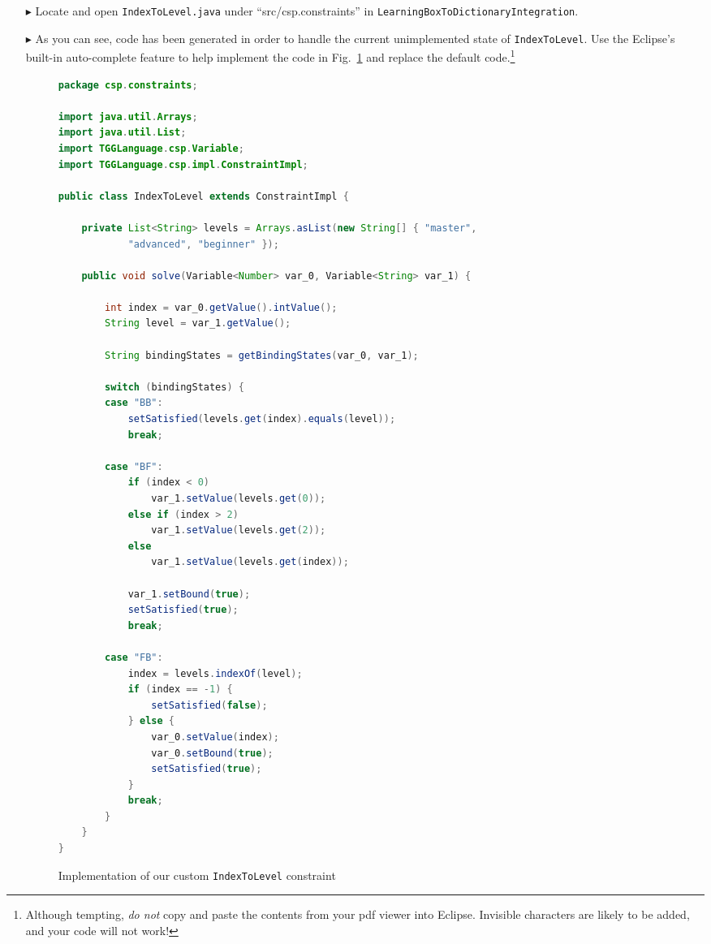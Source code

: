 \begin{itemize}
\item[$\blacktriangleright$] Locate and open \texttt{IndexToLevel.java} under ``src/csp.constraints'' in \texttt{LearningBoxToDictionaryIntegration}.

\item[$\blacktriangleright$] As you can see, code has been generated in order to handle the current unimplemented state of \texttt{IndexToLevel}. Use the
Eclipse's built-in auto-complete feature to help implement the code in Fig.~\ref{fig:indexToLevel} and replace the default code.\footnote{Although tempting,
\emph{do not} copy and paste the contents from your pdf viewer into Eclipse. Invisible characters are likely to be added, and your code will not work!}

\begin{figure}[htbp]
\begin{center}
\begin{lstlisting}[language=Java,backgroundcolor=\color{white}, keywordstyle={\bfseries\color{purple}}]
package csp.constraints;

import java.util.Arrays;
import java.util.List;
import TGGLanguage.csp.Variable;
import TGGLanguage.csp.impl.ConstraintImpl;

public class IndexToLevel extends ConstraintImpl {

	private List<String> levels = Arrays.asList(new String[] { "master",
			"advanced", "beginner" });

	public void solve(Variable<Number> var_0, Variable<String> var_1) {

		int index = var_0.getValue().intValue();
		String level = var_1.getValue();

		String bindingStates = getBindingStates(var_0, var_1);

		switch (bindingStates) {
		case "BB":
			setSatisfied(levels.get(index).equals(level));
			break;

		case "BF":
			if (index < 0)
				var_1.setValue(levels.get(0));
			else if (index > 2)
				var_1.setValue(levels.get(2));
			else
				var_1.setValue(levels.get(index));

			var_1.setBound(true);
			setSatisfied(true);
			break;

		case "FB":
			index = levels.indexOf(level);
			if (index == -1) {
				setSatisfied(false);
			} else {
				var_0.setValue(index);
				var_0.setBound(true);
				setSatisfied(true);
			}
			break;
		}
	}
}
\end{lstlisting}
  \caption{Implementation of our custom \texttt{IndexToLevel} constraint}
  \label{fig:indexToLevel}
\end{center}
\end{figure}

\end{itemize}

